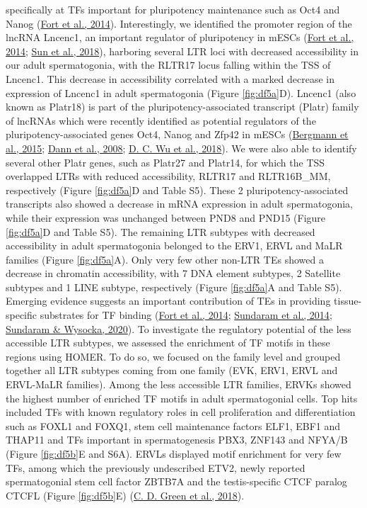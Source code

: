 \documentclass[12pt,twoside]{reedthesis}
\begin{document}
specifically at TFs important for pluripotency maintenance such as Oct4
and Nanog (\protect\hyperlink{ref-fort2014}{Fort et al., 2014}). Interestingly, we identified the promoter region
of the lncRNA Lncenc1, an important regulator of pluripotency in mESCs
(\protect\hyperlink{ref-fort2014}{Fort et al., 2014}; \protect\hyperlink{ref-sun2018}{Sun et al., 2018}), harboring several LTR loci with decreased
accessibility in our adult spermatogonia, with the RLTR17 locus falling
within the TSS of Lncenc1. This decrease in accessibility correlated
with a marked decrease in expression of Lncenc1 in adult spermatogonia
(Figure \ref{fig:df5a}D). Lncenc1 (also known as Platr18) is part of the
pluripotency-associated transcript (Platr) family of lncRNAs which were
recently identified as potential regulators of the
pluripotency-associated genes Oct4, Nanog and Zfp42 in mESCs (\protect\hyperlink{ref-bergmann2015}{Bergmann et al., 2015}; \protect\hyperlink{ref-dann2008}{Dann et al., 2008}; \protect\hyperlink{ref-wu2018}{D. C. Wu et al., 2018}). We were also able to identify several other
Platr genes, such as Platr27 and Platr14, for which the TSS overlapped
LTRs with reduced accessibility, RLTR17 and RLTR16B\_MM, respectively
(Figure \ref{fig:df5a}D and Table S5). These 2 pluripotency-associated transcripts also
showed a decrease in mRNA expression in adult spermatogonia, while their
expression was unchanged between PND8 and PND15 (Figure \ref{fig:df5a}D and Table S5).
The remaining LTR subtypes with decreased accessibility in adult
spermatogonia belonged to the ERV1, ERVL and MaLR families (Figure \ref{fig:df5a}A).
Only very few other non-LTR TEs showed a decrease in chromatin
accessibility, with 7 DNA element subtypes, 2 Satellite subtypes and 1
LINE subtype, respectively (Figure \ref{fig:df5a}A and Table S5). Emerging evidence
suggests an important contribution of TEs in providing tissue-specific
substrates for TF binding (\protect\hyperlink{ref-fort2014}{Fort et al., 2014}; \protect\hyperlink{ref-sundaram2014}{Sundaram et al., 2014}; \protect\hyperlink{ref-sundaram2020}{Sundaram \& Wysocka, 2020}). To
investigate the regulatory potential of the less accessible LTR
subtypes, we assessed the enrichment of TF motifs in these regions using
HOMER. To do so, we focused on the family level and grouped together all
LTR subtypes coming from one family (EVK, ERV1, ERVL and ERVL-MaLR
families). Among the less accessible LTR families, ERVKs showed the
highest number of enriched TF motifs in adult spermatogonial cells. Top
hits included TFs with known regulatory roles in cell proliferation and
differentiation such as FOXL1 and FOXQ1, stem cell maintenance factors
ELF1, EBF1 and THAP11 and TFs important in spermatogenesis PBX3, ZNF143
and NFYA/B (Figure \ref{fig:df5b}E and S6A). ERVLs displayed motif enrichment for very
few TFs, among which the previously undescribed ETV2, newly reported
spermatogonial stem cell factor ZBTB7A and the testis-specific CTCF
paralog CTCFL (Figure \ref{fig:df5b}E) (\protect\hyperlink{ref-green2018}{C. D. Green et al., 2018}).
\end{document}
